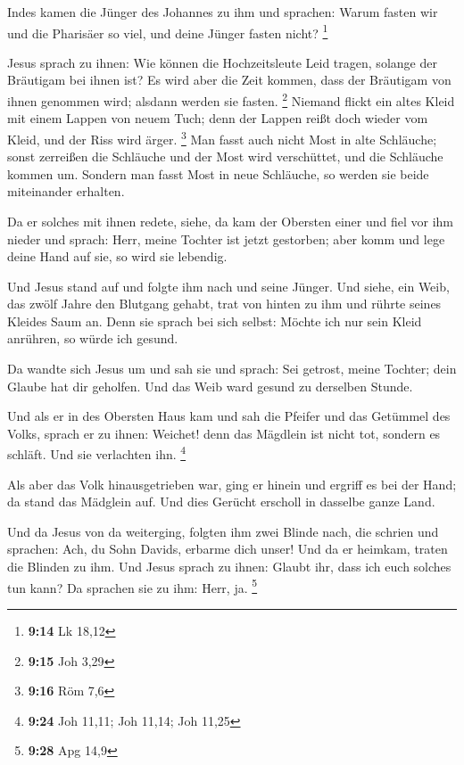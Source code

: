  Indes kamen die Jünger des Johannes zu ihm und sprachen:
Warum fasten wir und die Pharisäer so viel, und deine Jünger fasten
nicht? \footnote{\textbf{9:14} Lk 18,12}

 Jesus sprach zu ihnen: Wie können die Hochzeitsleute
Leid tragen, solange der Bräutigam bei ihnen ist? Es wird aber die Zeit
kommen, dass der Bräutigam von ihnen genommen wird; alsdann werden sie
fasten. \footnote{\textbf{9:15} Joh 3,29}  Niemand flickt
ein altes Kleid mit einem Lappen von neuem Tuch; denn der Lappen reißt
doch wieder vom Kleid, und der Riss wird ärger. \footnote{\textbf{9:16}
  Röm 7,6}  Man fasst auch nicht Most in alte Schläuche;
sonst zerreißen die Schläuche und der Most wird verschüttet, und die
Schläuche kommen um. Sondern man fasst Most in neue Schläuche, so werden
sie beide miteinander erhalten.

 Da er solches mit ihnen redete, siehe, da kam der
Obersten einer und fiel vor ihm nieder und sprach: Herr, meine Tochter
ist jetzt gestorben; aber komm und lege deine Hand auf sie, so wird sie
lebendig.

 Und Jesus stand auf und folgte ihm nach und seine
Jünger.  Und siehe, ein Weib, das zwölf Jahre den
Blutgang gehabt, trat von hinten zu ihm und rührte seines Kleides Saum
an.  Denn sie sprach bei sich selbst: Möchte ich nur sein
Kleid anrühren, so würde ich gesund.

 Da wandte sich Jesus um und sah sie und sprach: Sei
getrost, meine Tochter; dein Glaube hat dir geholfen. Und das Weib ward
gesund zu derselben Stunde.

 Und als er in des Obersten Haus kam und sah die Pfeifer
und das Getümmel des Volks,  sprach er zu ihnen: Weichet!
denn das Mägdlein ist nicht tot, sondern es schläft. Und sie verlachten
ihn. \footnote{\textbf{9:24} Joh 11,11; Joh 11,14; Joh 11,25}

 Als aber das Volk hinausgetrieben war, ging er hinein
und ergriff es bei der Hand; da stand das Mädglein auf. 
Und dies Gerücht erscholl in dasselbe ganze Land.

 Und da Jesus von da weiterging, folgten ihm zwei Blinde
nach, die schrien und sprachen: Ach, du Sohn Davids, erbarme dich unser!
 Und da er heimkam, traten die Blinden zu ihm. Und Jesus
sprach zu ihnen: Glaubt ihr, dass ich euch solches tun kann? Da sprachen
sie zu ihm: Herr, ja. \footnote{\textbf{9:28} Apg 14,9}

